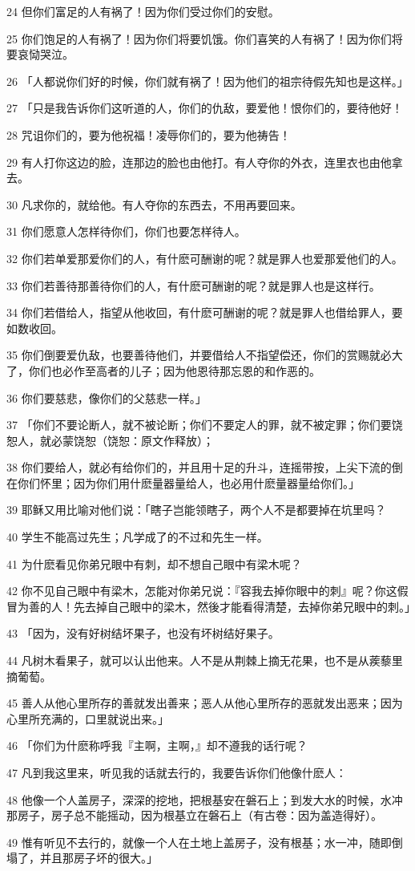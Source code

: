 \par 24 但你们富足的人有祸了！因为你们受过你们的安慰。
\par 25 你们饱足的人有祸了！因为你们将要饥饿。你们喜笑的人有祸了！因为你们将要哀恸哭泣。
\par 26 「人都说你们好的时候，你们就有祸了！因为他们的祖宗待假先知也是这样。」
\par 27 「只是我告诉你们这听道的人，你们的仇敌，要爱他！恨你们的，要待他好！
\par 28 咒诅你们的，要为他祝福！凌辱你们的，要为他祷告！
\par 29 有人打你这边的脸，连那边的脸也由他打。有人夺你的外衣，连里衣也由他拿去。
\par 30 凡求你的，就给他。有人夺你的东西去，不用再要回来。
\par 31 你们愿意人怎样待你们，你们也要怎样待人。
\par 32 你们若单爱那爱你们的人，有什麽可酬谢的呢？就是罪人也爱那爱他们的人。
\par 33 你们若善待那善待你们的人，有什麽可酬谢的呢？就是罪人也是这样行。
\par 34 你们若借给人，指望从他收回，有什麽可酬谢的呢？就是罪人也借给罪人，要如数收回。
\par 35 你们倒要爱仇敌，也要善待他们，并要借给人不指望偿还，你们的赏赐就必大了，你们也必作至高者的儿子；因为他恩待那忘恩的和作恶的。
\par 36 你们要慈悲，像你们的父慈悲一样。」
\par 37 「你们不要论断人，就不被论断；你们不要定人的罪，就不被定罪；你们要饶恕人，就必蒙饶恕（饶恕：原文作释放）；
\par 38 你们要给人，就必有给你们的，并且用十足的升斗，连摇带按，上尖下流的倒在你们怀里；因为你们用什麽量器量给人，也必用什麽量器量给你们。」
\par 39 耶稣又用比喻对他们说：「瞎子岂能领瞎子，两个人不是都要掉在坑里吗？
\par 40 学生不能高过先生；凡学成了的不过和先生一样。
\par 41 为什麽看见你弟兄眼中有刺，却不想自己眼中有梁木呢？
\par 42 你不见自己眼中有梁木，怎能对你弟兄说：『容我去掉你眼中的刺』呢？你这假冒为善的人！先去掉自己眼中的梁木，然後才能看得清楚，去掉你弟兄眼中的刺。」
\par 43 「因为，没有好树结坏果子，也没有坏树结好果子。
\par 44 凡树木看果子，就可以认出他来。人不是从荆棘上摘无花果，也不是从蒺藜里摘葡萄。
\par 45 善人从他心里所存的善就发出善来；恶人从他心里所存的恶就发出恶来；因为心里所充满的，口里就说出来。」
\par 46 「你们为什麽称呼我『主啊，主啊，』却不遵我的话行呢？
\par 47 凡到我这里来，听见我的话就去行的，我要告诉你们他像什麽人：
\par 48 他像一个人盖房子，深深的挖地，把根基安在磐石上；到发大水的时候，水冲那房子，房子总不能摇动，因为根基立在磐石上（有古卷：因为盖造得好）。
\par 49 惟有听见不去行的，就像一个人在土地上盖房子，没有根基；水一冲，随即倒塌了，并且那房子坏的很大。」

